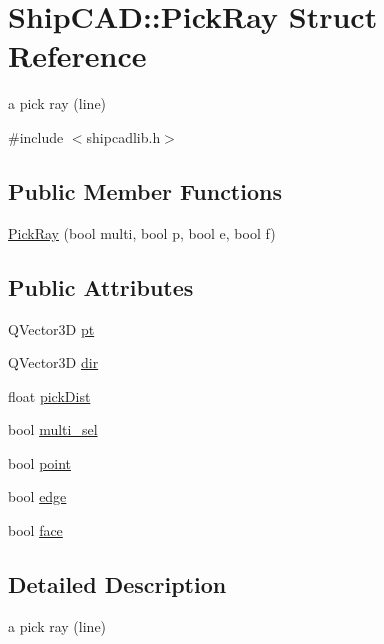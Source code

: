 \hypertarget{structShipCAD_1_1PickRay}{}\section{Ship\+C\+AD\+:\+:Pick\+Ray Struct Reference}
\label{structShipCAD_1_1PickRay}


a pick ray (line)  




{\ttfamily \#include $<$shipcadlib.\+h$>$}

\subsection*{Public Member Functions}
\begin{DoxyCompactItemize}
\item 
\hyperlink{structShipCAD_1_1PickRay_a423b609ea367f578f4c8abc6638daec4}{Pick\+Ray} (bool multi, bool p, bool e, bool f)
\end{DoxyCompactItemize}
\subsection*{Public Attributes}
\begin{DoxyCompactItemize}
\item 
Q\+Vector3D \hyperlink{structShipCAD_1_1PickRay_a2a9ed44a643481ceefcdec276ce7425a}{pt}
\item 
Q\+Vector3D \hyperlink{structShipCAD_1_1PickRay_a9e277629b120f405d2780f1235e8dcb1}{dir}
\item 
float \hyperlink{structShipCAD_1_1PickRay_aea6c9d67dc7245b1edf930dfe019d4db}{pick\+Dist}
\item 
bool \hyperlink{structShipCAD_1_1PickRay_a5b5dbf3de2afc804978a5e35ac582028}{multi\+\_\+sel}
\item 
bool \hyperlink{structShipCAD_1_1PickRay_a6576863fe4c5cb5eaa5ebcaa474104c8}{point}
\item 
bool \hyperlink{structShipCAD_1_1PickRay_a9882c4e0e43e2141cbaa196fe109cf19}{edge}
\item 
bool \hyperlink{structShipCAD_1_1PickRay_a76218677660d84089b3db5a137410cec}{face}
\end{DoxyCompactItemize}


\subsection{Detailed Description}
a pick ray (line) 

